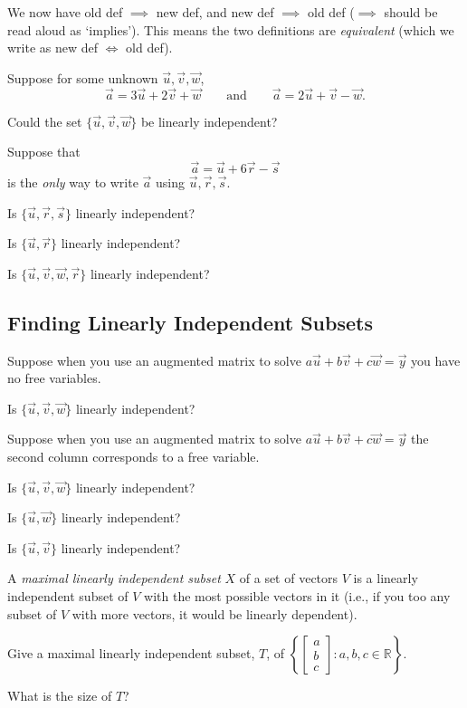 \documentclass{article}
\newcommand{\R}{\mathbb{R}}
\newcommand{\mat}[1]{\begin{bmatrix}#1\end{bmatrix}}
\begin{document}
	We now have old def $\implies$ new def, and new def $\implies$ old def ($\implies$
	should be read aloud as `implies').  This means the two definitions
	are \emph{equivalent} (which we write as new def $\iff$ old def).


	Suppose for some unknown $\vec u,\vec v,\vec w$,
	\[
		\vec a = 3\vec u+2\vec v +\vec w\qquad \text{and}\qquad 
		\vec a = 2\vec u+\vec v -\vec w.
	\]
	\begin{Enum}
		\item Could the set $\{\vec u,\vec v,\vec w\}$ be linearly
		independent?
	\end{Enum}
	Suppose that
	\[
		\vec a = \vec u+6\vec r-\vec s
	\]
	is the \emph{only} way to write $\vec a$ using $\vec u,\vec r,\vec s$.
	\begin{Enum}[resume]
		\item Is $\{\vec u,\vec r,\vec s\}$ linearly independent?
		\item Is $\{\vec u,\vec r\}$ linearly independent?
		\item Is $\{\vec u,\vec v,\vec w,\vec r\}$ linearly independent?
	\end{Enum}

\subsection*{Finding Linearly Independent Subsets}
	Suppose when you use an augmented matrix to solve
	$a\vec u+b\vec v+c\vec w=\vec y$ you have no free variables.
	
	\begin{Enum}
		\item Is $\{\vec u,\vec v,\vec w\}$ linearly independent?
	\end{Enum}
	
	Suppose when you use an augmented matrix to solve
	$a\vec u+b\vec v+c\vec w=\vec y$ the second column corresponds to a 
	free variable.
	
	\begin{Enum}[resume]
		\item Is $\{\vec u,\vec v,\vec w\}$ linearly independent?
		\item Is $\{\vec u,\vec w\}$ linearly independent?
		\item Is $\{\vec u,\vec v\}$ linearly independent?
	\end{Enum}

	A \emph{maximal linearly independent subset} $X$ of a set of vectors $V$
	is a linearly independent subset of $V$ with the most possible vectors in it 
	(i.e., if you too any subset of $V$ with more vectors, it would be linearly
	dependent).

	\begin{Enum}
		\item Give a maximal linearly independent subset, $T$, of
		$\left\{\mat{a\\b\\c}:a,b,c\in \R\right\}$.
		\item What is the size of $T$?
	\end{Enum}
\end{document}
